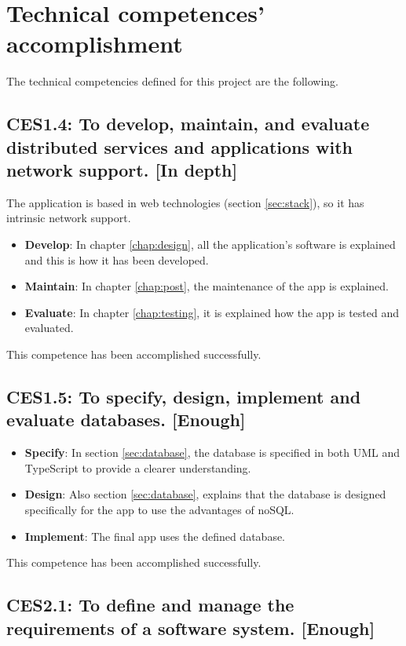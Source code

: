 \clearpage\newpage
\section{Technical competences' accomplishment}
The technical competencies defined for this project are the following.

\subsection*{CES1.4: To develop, maintain, and evaluate distributed services and applications with network support. {\normalfont\normalsize [In depth]}}

The application is based in web technologies (section \ref{sec:stack}), so it has intrinsic network support. 
\begin{itemize}
    \item \textbf{Develop}: In chapter \ref{chap:design}, all the application's software is explained and this is how it has been developed.
    \item \textbf{Maintain}: In chapter \ref{chap:post}, the maintenance of the app is explained.
    \item \textbf{Evaluate}: In chapter \ref{chap:testing}, it is explained how the app is tested and evaluated.
\end{itemize}

\noindent
This competence has been accomplished successfully.

\subsection*{CES1.5: To specify, design, implement and evaluate databases. {\normalfont\normalsize [Enough]}}

\begin{itemize}
    \item \textbf{Specify}: In section \ref{sec:database}, the database is specified in both UML and TypeScript to provide a clearer understanding.
    \item \textbf{Design}: Also section \ref{sec:database}, explains that the database is designed specifically for the app to use the advantages of noSQL.
    \item \textbf{Implement}: The final app uses the defined database.
\end{itemize}

\noindent
This competence has been accomplished successfully.

\subsection*{CES2.1: To define and manage the requirements of a software system. {\normalfont\normalsize [Enough]}}

